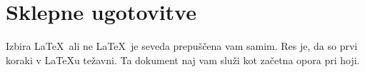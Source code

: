 





\chapter{Sklepne ugotovitve}
Izbira \LaTeX\ ali ne \LaTeX\ je seveda prepuščena vam samim. Res je, da so prvi koraki v \LaTeX{}u težavni. Ta dokument naj vam služi kot začetna opora pri hoji.

